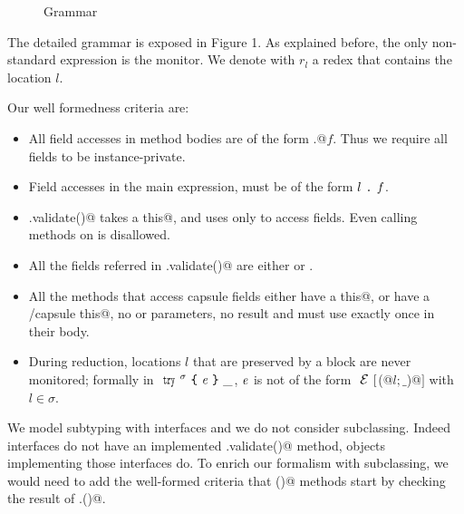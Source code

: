 \begin{figure}
\caption{Grammar}
\end{figure}

The detailed grammar is exposed in Figure 1.
As explained before, the only non-standard expression is the monitor.
We denote with $r_l$ a redex that contains the location $l$.

\noindent Our well formedness criteria are:
\begin{itemize}
\item All field accesses in method bodies are of the form
\Q@this.@$f$. Thus we require all fields to be instance-private.

\item Field accesses in the main expression, 
must be of the form $l{ \mbox{ {\texttt{.}} } }\mathit{f}$.

\item \Q@.validate()@ takes a \Q@read this@, and uses \Q@this@ only to access fields. Even calling methods on \Q@this@
is disallowed.
\item All the fields referred in \Q@.validate()@ are either \Q@imm@ or \Q@capsule@.
\item All the methods that access capsule fields 
either have a \Q@read this@,
or have a \Q@mut/capsule this@, no \Q@mut@ or \Q@read@ parameters, no \Q@mut@ result and 
must use \Q@this@ exactly once in their body.
\item 
During reduction, locations $l$ that are preserved by a \Q@try@ block are
never monitored; formally 
in $\Kw{try}^\sigma\oC\e\cC\_$, ${\mathit{e}}$ is not of the form $\ctx[$\Q@M(@$l;\_$\Q@)@$]$ with $l\in\sigma$.
\end{itemize}

We model subtyping with interfaces 
and we do not consider subclassing.
Indeed interfaces do not have an implemented \Q@.validate()@ method, objects implementing those interfaces do.
To enrich our formalism with subclassing, we would need to add the 
well-formed criteria that \Q@validate()@ 
methods start by checking the result of \Q@super@.\Q@validate()@.

